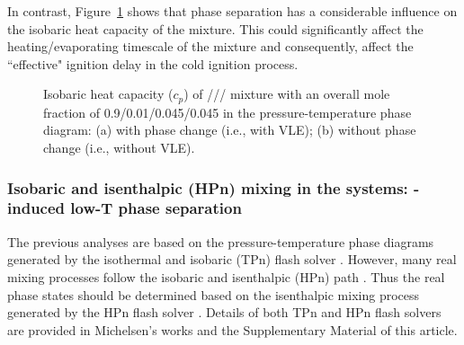     In contrast, Figure~\ref{fig:PTdiagram_cp} shows that phase separation has a considerable influence on the isobaric heat capacity of the mixture. This could significantly affect the heating/evaporating timescale of the mixture and consequently, affect the ``effective" ignition delay in the cold ignition process.

    \begin{figure}[htb]
        \centering


        \caption{Isobaric heat capacity ($c_p$) of /// mixture with an overall mole fraction of 0.9/0.01/0.045/0.045 in the pressure-temperature phase diagram: (a) with phase change (i.e., with VLE); (b) without phase change (i.e., without VLE).}
        \label{fig:PTdiagram_cp}
    \end{figure}


\subsubsection{Isobaric and isenthalpic (HPn) mixing in the  systems: -induced low-T phase separation} \label{sec:results:combustor:HPn}
The previous analyses %
are based on the pressure-temperature phase diagrams generated by the isothermal and isobaric (TPn) flash solver \cite{michelsen1982isothermal}.
However, many real mixing processes follow the isobaric and isenthalpic (HPn) path \cite{serrano2018development}. Thus the real phase states should be determined based on the isenthalpic mixing process generated by the HPn flash solver \cite{michelsen1987multiphase}. Details of both TPn and HPn flash solvers are provided in Michelsen's works \cite{michelsen1982isothermal,michelsen1987multiphase} and the Supplementary Material of this article.


